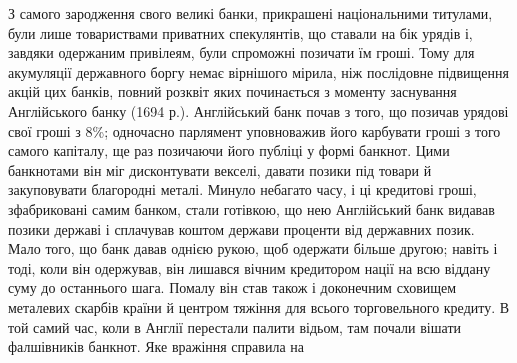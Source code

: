 З самого зародження свого великі банки, прикрашені національними титулами, були лише товариствами
приватних спекулянтів, що ставали на бік урядів і, завдяки одержаним привілеям, були спроможні
позичати їм гроші. Тому для акумуляції
державного боргу немає вірнішого мірила, ніж послідовне підвищення акцій цих банків, повний розквіт
яких починається з моменту заснування Англійського банку (1694 р.). Англійський банк почав з того,
що позичав урядові свої гроші з 8\%; одночасно
парлямент уповноважив його карбувати гроші з того самого капіталу, ще раз позичаючи його публіці у
формі банкнот. Цими банкнотами він міг дисконтувати векселі, давати позики під товари й закуповувати
благородні металі. Минуло небагато
часу, і ці кредитові гроші, зфабриковані самим банком, стали готівкою, що нею Англійський банк
видавав позики державі і сплачував коштом держави проценти від державних позик. Мало того, що банк
давав однією рукою, щоб одержати більше другою; навіть і тоді, коли він одержував, він лишався
вічним кредитором нації на всю віддану суму до останнього шага. Помалу він став також і доконечним
сховищем металевих скарбів країни й центром тяжіння для всього торговельного кредиту.
В той самий час, коли в Англії перестали палити відьом, там почали вішати фалшівників банкнот. Яке
вражіння справила на
\parbreak{}  %
